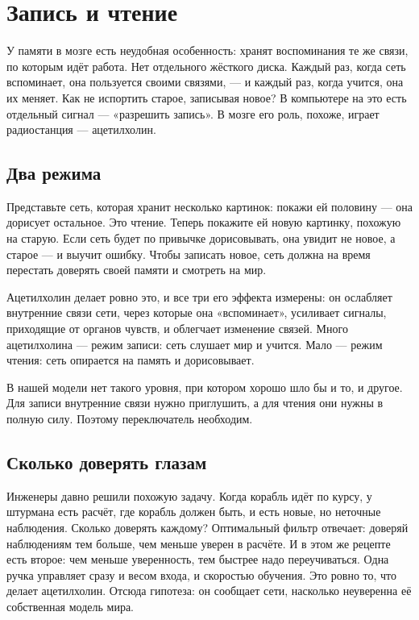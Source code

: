\chapter{Запись и чтение}

У памяти в мозге есть неудобная особенность: хранят воспоминания те же связи, по которым идёт работа. Нет отдельного жёсткого диска. Каждый раз, когда сеть вспоминает, она пользуется своими связями, --- и каждый раз, когда учится, она их меняет. Как не испортить старое, записывая новое? В компьютере на это есть отдельный сигнал --- «разрешить запись». В мозге его роль, похоже, играет радиостанция  --- ацетилхолин.

\section*{Два режима}

Представьте сеть, которая хранит несколько картинок: покажи ей половину --- она дорисует остальное. Это чтение. Теперь покажите ей новую картинку, похожую на старую. Если сеть будет по привычке дорисовывать, она увидит не новое, а старое --- и выучит ошибку. Чтобы записать новое, сеть должна на время перестать доверять своей памяти и смотреть на мир.


Ацетилхолин делает ровно это, и все три его эффекта измерены: он ослабляет внутренние связи сети, через которые она «вспоминает», усиливает сигналы, приходящие от органов чувств, и облегчает изменение связей. Много ацетилхолина --- режим записи: сеть слушает мир и учится. Мало --- режим чтения: сеть опирается на память и дорисовывает.

В нашей модели нет такого уровня, при котором хорошо шло бы и то, и другое. Для записи внутренние связи нужно приглушить, а для чтения они нужны в полную силу. Поэтому переключатель необходим.

\section*{Сколько доверять глазам}

Инженеры давно решили похожую задачу. Когда корабль идёт по курсу, у штурмана есть расчёт, где корабль должен быть, и есть новые, но неточные наблюдения. Сколько доверять каждому? Оптимальный фильтр отвечает: доверяй наблюдениям тем больше, чем меньше уверен в расчёте. И в этом же рецепте есть второе: чем меньше уверенность, тем быстрее надо переучиваться. Одна ручка управляет сразу и весом входа, и скоростью обучения. Это ровно то, что делает ацетилхолин. Отсюда гипотеза: он сообщает сети, насколько неуверенна её собственная модель мира.

